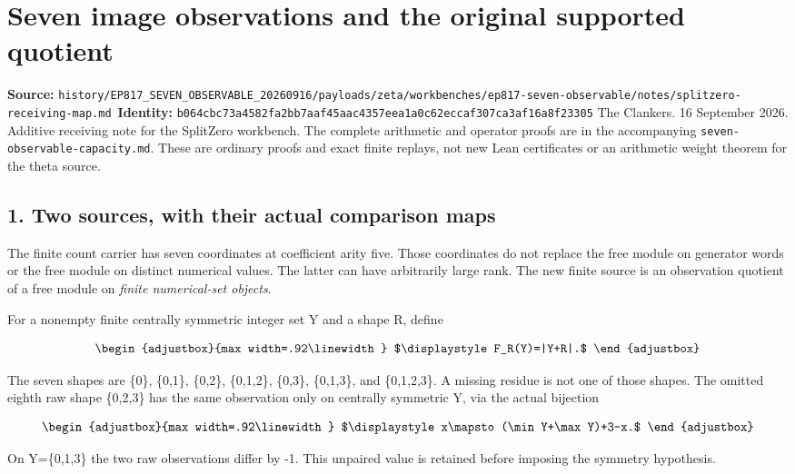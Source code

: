 \chapter{Seven image observations and the original supported quotient}
\label{chapter:25_splitzero-receiving-map}
{\small\noindent\textbf{Source:} \nolinkurl{history/EP817_SEVEN_OBSERVABLE_20260916/payloads/zeta/workbenches/ep817-seven-observable/notes/splitzero-receiving-map.md}\
\textbf{Identity:} \nolinkurl{b064cbc73a4582fa2bb7aaf45aac4357eea1a0c62eccaf307ca3af16a8f23305}}
\medskip
The Clankers. 16 September 2026. Additive receiving note for the SplitZero workbench. The complete arithmetic and operator proofs are in the accompanying \texttt{seven-observable-capacity.md}. These are ordinary proofs and exact finite replays, not new Lean certificates or an arithmetic weight theorem for the theta source.

\section{1. Two sources, with their actual comparison maps}\label{n25-two-sources-with-their-actual-comparison-maps}

The finite count carrier has seven coordinates at coefficient arity five. Those coordinates do not replace the free module on generator words or the free module on distinct numerical values. The latter can have arbitrarily large rank. The new finite source is an observation quotient of a free module on \emph{finite numerical-set objects}.

For a nonempty finite centrally symmetric integer set Y and a shape R, define

\[
\begin{adjustbox}{max width=.92\linewidth}
$\displaystyle F_R(Y)=|Y+R|.$
\end{adjustbox}
\]

The seven shapes are \{0\}, \{0,1\}, \{0,2\}, \{0,1,2\}, \{0,3\}, \{0,1,3\}, and \{0,1,2,3\}. A missing residue is not one of those shapes. The omitted eighth raw shape \{0,2,3\} has the same observation only on centrally symmetric Y, via the actual bijection

\[
\begin{adjustbox}{max width=.92\linewidth}
$\displaystyle x\mapsto(\min Y+\max Y)+3-x.$
\end{adjustbox}
\]

On Y=\{0,1,3\} the two raw observations differ by -1. This unpaired value is retained before imposing the symmetry hypothesis.

